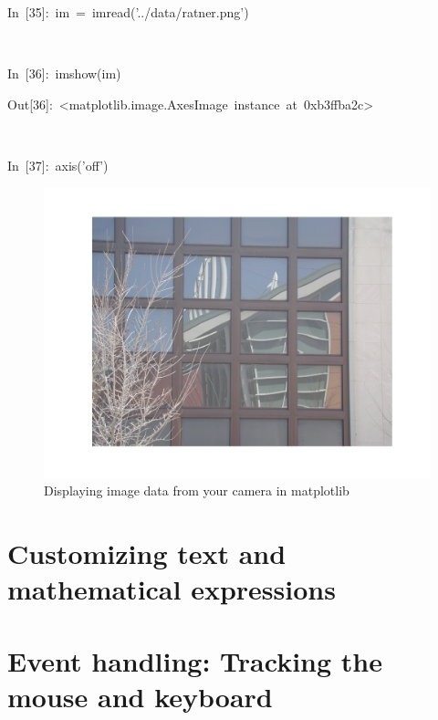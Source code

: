 \begin{lyxcode}
In~{[}35]:~im~=~imread('../data/ratner.png')

~

In~{[}36]:~imshow(im)

Out{[}36]:~<matplotlib.image.AxesImage~instance~at~0xb3ffba2c>

~

In~{[}37]:~axis('off')

%
\begin{figure}
\begin{centering}
\includegraphics[width=5in]{fig/mpl_ratner}
\par\end{centering}

\caption{\label{fig:mpl_ratner}Displaying image data from your camera in matplotlib}

\end{figure}

\end{lyxcode}

\section[Text]{Customizing text and mathematical expressions}


\section[Event]{Event handling: Tracking the mouse and keyboard}
